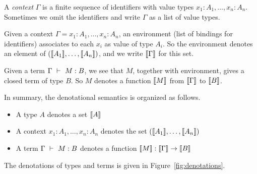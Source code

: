 \begin{definition}
 A \emph{context} $\Gamma$ is a finite sequence of identifiers with value
 types $x_1:A_1, \dots ,x_n:A_n$. Sometimes we omit the identifiers and
 write $\Gamma$ as a list of value types.
\end{definition}

Given a context $\Gamma = x_1:A_1,\dots,x_n:A_n$, an environment (list of
bindings for identifiers) associates to each $x_i$ as value of type $A_i$. So
the environment denotes an element of $(\llbracket A_1\rrbracket,\dots,\llbracket A_n\rrbracket)$, and
we write $\llbracket\Gamma\rrbracket$ for this set.

Given a \corelang term $\Gamma~\vdash~M: B$, we see that $M$, together with
environment, gives a closed term of type $B$. So $M$ denotes a function
$\llbracket M\rrbracket$ from $\llbracket\Gamma\rrbracket$ to $\llbracket B\rrbracket$.

In summary, the denotational semantics is organized as follows.

\begin{itemize}
  \item A type $A$ denotes a set $\llbracket A\rrbracket$
  \item A context $x_1:A_1,\dots,x_n:A_n$ denotes the set $(\llbracket A_1\rrbracket,\dots,\llbracket A_n\rrbracket)$
  \item A term $\Gamma~\vdash~M: B$ denotes a function $\llbracket M\rrbracket:
  \llbracket\Gamma\rrbracket \to \llbracket B\rrbracket$
\end{itemize}

The denotations of types and terms is given in Figure~\ref{fig:denotations}.

